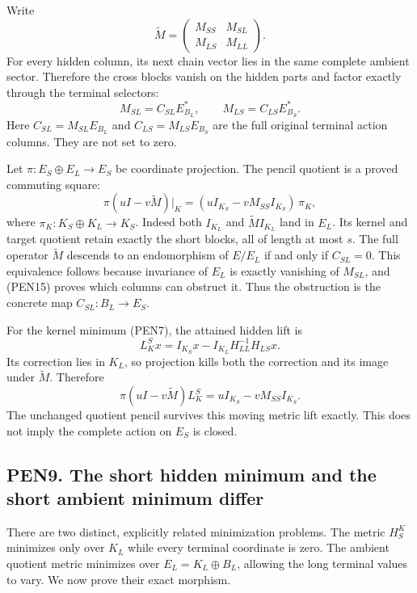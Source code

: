 \documentclass[11pt]{article}
\begin{document}
Write \[
\widetilde M=
\begin{pmatrix}M_{SS}&M_{SL}\\M_{LS}&M_{LL}\end{pmatrix}.
\] For every hidden column, its next chain vector lies in the same complete ambient sector. Therefore the cross blocks vanish on the hidden parts and factor exactly through the terminal selectors: \[
M_{SL}=C_{SL}E_{B_L}^*,\qquad
M_{LS}=C_{LS}E_{B_S}^*. \tag{PEN15}
\] Here \(C_{SL}=M_{SL}E_{B_L}\) and \(C_{LS}=M_{LS}E_{B_S}\) are the full original terminal action columns. They are not set to zero.

Let \(\pi:E_S\oplus E_L\to E_S\) be coordinate projection. The pencil quotient is a proved commuting square: \[
\pi(uI-v\widetilde M)|_K
=(uI_{K_S}-vM_{SS}I_{K_S})\,\pi_K,
\] where \(\pi_K:K_S\oplus K_L\to K_S\). Indeed both \(I_{K_L}\) and \(\widetilde M I_{K_L}\) land in \(E_L\). Its kernel and target quotient retain exactly the short blocks, all of length at most \(s\). The full operator \(\widetilde M\) descends to an endomorphism of \(E/E_L\) if and only if \(C_{SL}=0\). This equivalence follows because invariance of \(E_L\) is exactly vanishing of \(M_{SL}\), and (PEN15) proves which columns can obstruct it. Thus the obstruction is the concrete map \(C_{SL}:B_L\to E_S\).

For the kernel minimum (PEN7), the attained hidden lift is \[
L_K^S x=I_{K_S}x-I_{K_L}H_{LL}^{-1}H_{LS}x.
\] Its correction lies in \(K_L\), so projection kills both the correction and its image under \(\widetilde M\). Therefore \[
\pi(uI-v\widetilde M)L_K^S
=uI_{K_S}-vM_{SS}I_{K_S}. \tag{PEN16}
\] The unchanged quotient pencil survives this moving metric lift exactly. This does not imply the complete action on \(E_S\) is closed.

\subsection{PEN9. The short hidden minimum and the short ambient minimum differ}\label{pen9.-the-short-hidden-minimum-and-the-short-ambient-minimum-differ}

There are two distinct, explicitly related minimization problems. The metric \(H_S^K\) minimizes only over \(K_L\) while every terminal coordinate is zero. The ambient quotient metric minimizes over \(E_L=K_L\oplus B_L\), allowing the long terminal values to vary. We now prove their exact morphism.
\end{document}
